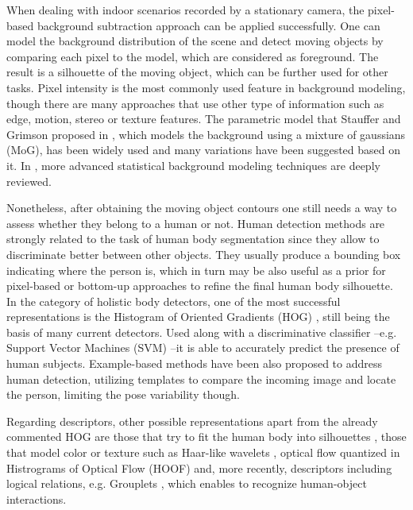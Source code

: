 \documentclass[10pt,twocolumn,letterpaper]{article}
\begin{document}
 When dealing with indoor scenarios recorded by a stationary camera, the pixel-based background subtraction approach can be applied successfully. One can model the background distribution of the scene and detect moving objects by comparing each pixel to the model, which are considered as foreground. The result is a silhouette of the moving object, which can be further used for other tasks. Pixel intensity is the most commonly used feature in background modeling, though there are many approaches that use other type of information such as edge, motion, stereo or texture features. The parametric model that Stauffer and Grimson proposed in \cite{stauffer1999adaptive}, which models the background using a mixture of gaussians (MoG), has been widely used and many variations have been suggested based on it. In \cite{bouwmans2011recent}, more advanced statistical background modeling techniques are deeply reviewed. 
 
Nonetheless, after obtaining the moving object contours one still needs a way to assess whether they belong to a human or not. Human detection methods are strongly related to the task of human body segmentation since they allow to discriminate better between other objects. They usually produce a bounding box indicating where the person is, which in turn may be also useful as a prior for pixel-based or bottom-up approaches to refine the final human body silhouette. In the category of holistic body detectors, one of the most successful representations is the Histogram of Oriented Gradients (HOG) \cite{dalal2005histograms}, still being the basis of many current detectors. Used along with a discriminative classifier --e.g. Support Vector Machines (SVM) \cite{hearst1998support} --it is able to accurately predict the presence of human subjects. Example-based methods \cite{andriluka2010monocular} have been also proposed to address human detection, utilizing templates to compare the incoming image and locate the person, limiting the pose variability though.  

Regarding descriptors, other possible representations apart from the already commented HOG are those that try to fit the human body into silhouettes \cite{mittal2003human}, those that model color or texture such as Haar-like wavelets \cite{viola2005detecting}, optical flow quantized in Histrograms of Optical Flow (HOOF) \cite{dalal2006human} and, more recently, descriptors including logical relations, e.g. Grouplets \cite{yao2010grouplet}, which enables to recognize human-object interactions.
\end{document}
